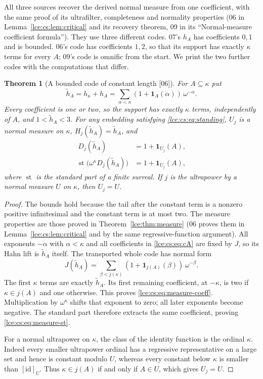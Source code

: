 \documentclass[11pt,letterpaper]{article}
\numberwithin{equation}{section}
\newtheorem{theorem}{Theorem}[section]
\theoremstyle{definition}
\theoremstyle{remark}
\newcommand{\coef}[2]{[\omega^{#1}]\,#2}
\newcommand{\thref}[1]{Theorem~\ref{#1}}
\newcommand{\leref}[1]{Lemma~\ref{#1}}
\newcommand{\src}[1]{\textup{\textsf{\small[#1]}}}%
\newcommand{\st}{\operatorname{st}}
\begin{document}
All three sources recover the derived normal measure from one coefficient,
with the same proof of its ultrafilter, completeness and normality
properties (06 in \leref{lce:cs:lem:critical} and its recovery theorem, 09
in its ``Normal-measure coefficient formula''). They use three different
codes. 07's $h_A$ has coefficients $0,1$ and is bounded. 06's code has
coefficients $1,2$, so that its support has exactly $\kappa$ terms for
every $A$; 09's code is omnific from the start. We print the two further
codes with the computations that differ.

\begin{theorem}[A bounded code of constant length \src{06}]\label{lce:cs:thm:recover}
For $A\subseteq\kappa$ put
\begin{equation}\label{lce:cs:eq:cA}
 \tilde h_A=h_\kappa+h_A=\sum_{\alpha<\kappa}(1+\mathbf 1_A(\alpha))\,\omega^{-\alpha}.
\end{equation}
Every coefficient is one or two, so the support has exactly $\kappa$ terms,
independently of $A$, and $1<\tilde h_A<3$. For any embedding satisfying
\eqref{lce:cs:eq:standing}, $U_j$ is a normal measure on $\kappa$,
$H_j(\tilde h_A)=\tilde h_A$, and
\begin{align}
 \coef{-\kappa}{D_j(\tilde h_A)}&=1+\mathbf 1_{U_j}(A),\label{lce:cs:eq:measure-coeff}\\
 \st\bigl(\omega^\kappa D_j(\tilde h_A)\bigr)&=1+\mathbf 1_{U_j}(A),\label{lce:cs:eq:measure-st}
\end{align}
where $\st$ is the standard part of a finite surreal. If $j$ is the
ultrapower by a normal measure $U$ on $\kappa$, then $U_j=U$.
\end{theorem}
\begin{proof}
The bounds hold because the tail after the constant term is a nonzero
positive infinitesimal and the constant term is at most two. The measure
properties are those proved in \thref{lce:thm:measure} (06 proves them in
\leref{lce:cs:lem:critical} and by the same regressive-function argument).
All exponents $-\alpha$ with $\alpha<\kappa$ and all coefficients in
\eqref{lce:cs:eq:cA} are fixed by $J$, so its Hahn lift is $\tilde h_A$
itself. The transported whole code has normal form
\[
 J(\tilde h_A)=\sum_{\beta<j(\kappa)}(1+\mathbf 1_{j(A)}(\beta))\,\omega^{-\beta}.
\]
The first $\kappa$ terms are exactly $\tilde h_A$. Its first remaining
coefficient, at $-\kappa$, is two if $\kappa\in j(A)$ and one otherwise.
This proves \eqref{lce:cs:eq:measure-coeff}. Multiplication by
$\omega^\kappa$ shifts that exponent to zero; all later exponents become
negative. The standard part therefore extracts the same coefficient,
proving \eqref{lce:cs:eq:measure-st}.

For a normal ultrapower on $\kappa$, the class of the identity function is
the ordinal $\kappa$. Indeed every smaller ultrapower ordinal has a
regressive representative on a large set and hence is constant modulo $U$,
whereas every constant below $\kappa$ is smaller than $[\mathrm{id}]_U$.
Thus $\kappa\in j(A)$ if and only if $A\in U$, which gives $U_j=U$.
\end{proof}
\end{document}
